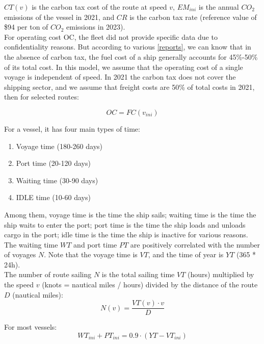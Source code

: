 \documentclass[a4paper,12pt]{article}
\begin{document}
$CT(v)$ is the carbon tax cost of the route at speed $v$, $EM_{ini}$ is the annual $CO_2$ emissions of the vessel in 2021, and $CR$ is the carbon tax rate (reference value of \$94 per ton of $CO_2$ emissions in 2023).\\

For operating cost OC, the fleet did not provide specific data due to confidentiality reasons.
But according to various \href{https://transportgeography.org/contents/chapter5/maritime-transportation/containerships-operating-costs-panamax-post-panamax/}{[reports]}, we can know that in the absence of carbon tax, the fuel cost of a ship generally accounts for 45\%-50\% of its total cost.
In this model, we assume that the operating cost of a single voyage is independent of speed.
In 2021 the carbon tax does not cover the shipping sector, and we assume that freight costs are 50\% of total costs in 2021, then for selected routes:

\begin{equation}
	\label{eq:operation_cost}
	OC = FC(v_{ini})
\end{equation}

For a vessel, it has four main types of time:
\begin{enumerate}
	\item Voyage time (180-260 days)
	\item Port time (20-120 days)
	\item Waiting time (30-90 days)
	\item IDLE time (10-60 days)
\end{enumerate}

Among them, voyage time is the time the ship sails; waiting time is the time the ship waits to enter the port; port time is the time the ship loads and unloads cargo in the port; idle time is the time the ship is inactive for various reasons.
The waiting time $WT$ and port time $PT$ are positively correlated with the number of voyages $N$.
Note that the voyage time is $VT$, and the time of year is $YT$ (365 * 24h). \\

The number of route sailing $N$ is the total sailing time $VT$ (hours) multiplied by the speed $v$ (knots = nautical miles / hours) divided by the distance of the route $D$ (nautical miles):
\begin{equation}
	\label{eq:vt}
	N(v) = \frac{VT(v) \cdot v }{D}
\end{equation}

For most vessels:
\begin{equation}
	\label{eq:ptwt0}
	WT_{ini}+PT_{ini} = 0.9 \cdot (YT-VT_{ini})
\end{equation}
\end{document}

